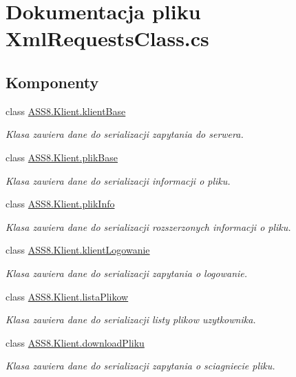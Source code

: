 \hypertarget{a00055}{
\section{Dokumentacja pliku XmlRequestsClass.cs}
\label{d4/d6d/a00055}
}
\subsection*{Komponenty}
\begin{CompactItemize}
\item 
class \hyperlink{a00007}{ASS8.Klient.klientBase}
\begin{CompactList}\small\item\em Klasa zawiera dane do serializacji zapytania do serwera. \item\end{CompactList}\item 
class \hyperlink{a00016}{ASS8.Klient.plikBase}
\begin{CompactList}\small\item\em Klasa zawiera dane do serializacji informacji o pliku. \item\end{CompactList}\item 
class \hyperlink{a00018}{ASS8.Klient.plikInfo}
\begin{CompactList}\small\item\em Klasa zawiera dane do serializacji rozszerzonych informacji o pliku. \item\end{CompactList}\item 
class \hyperlink{a00009}{ASS8.Klient.klientLogowanie}
\begin{CompactList}\small\item\em Klasa zawiera dane do serializacji zapytania o logowanie. \item\end{CompactList}\item 
class \hyperlink{a00015}{ASS8.Klient.listaPlikow}
\begin{CompactList}\small\item\em Klasa zawiera dane do serializacji listy plikow uzytkownika. \item\end{CompactList}\item 
class \hyperlink{a00002}{ASS8.Klient.downloadPliku}
\begin{CompactList}\small\item\em Klasa zawiera dane do serializacji zapytania o sciagniecie pliku. \item\end{CompactList}\item 

\end{CompactItemize}
